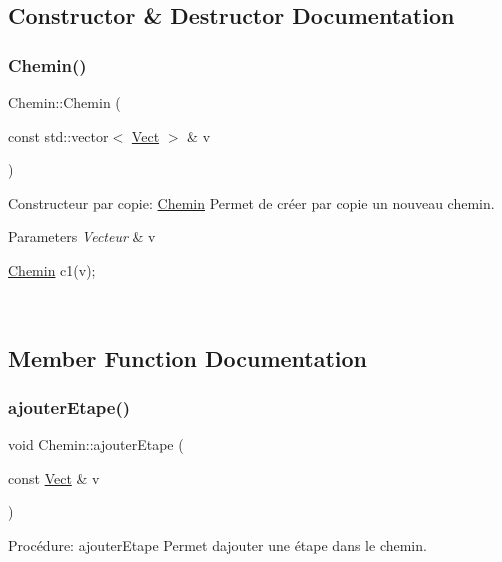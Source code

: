 \subsection{Constructor \& Destructor Documentation}
\mbox{\label{classChemin_acbb44d2dd9c7eda79740c3ddb2b435c5}} 
\subsubsection{\texorpdfstring{Chemin()}{Chemin()}}
{\footnotesize\ttfamily Chemin\+::\+Chemin (\begin{DoxyParamCaption}\item[{const std\+::vector$<$ \hyperlink{classVect}{Vect} $>$ \&}]{v }\end{DoxyParamCaption})}



Constructeur par copie\+: \hyperlink{classChemin}{Chemin} Permet de créer par copie un nouveau chemin. 


\begin{DoxyParams}{Parameters}
{\em Vecteur} & v 
\begin{DoxyCode}
\hyperlink{classChemin}{Chemin} c1(v);
\end{DoxyCode}
 \\
\hline
\end{DoxyParams}


\subsection{Member Function Documentation}
\mbox{\label{classChemin_a4cdbe032bca015c52dccbef4fa2cb647}} 
\subsubsection{\texorpdfstring{ajouter\+Etape()}{ajouterEtape()}}
{\footnotesize\ttfamily void Chemin\+::ajouter\+Etape (\begin{DoxyParamCaption}\item[{const \hyperlink{classVect}{Vect} \&}]{v }\end{DoxyParamCaption})}



Procédure\+: ajouter\+Etape Permet d\textquotesingle{}ajouter une étape dans le chemin. 


